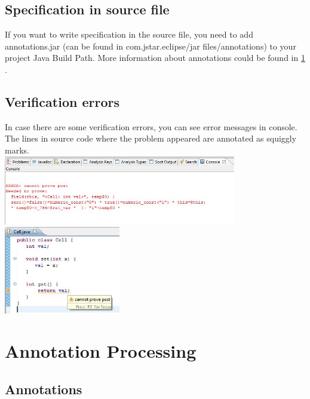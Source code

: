 \documentclass{article}
\begin{document}
\subsection*{Specification in source file}

If you want to write specification in the source file, you need to add annotations.jar (can be found in com.jstar.eclipse/jar files/annotations) to your project Java Build Path. More information about annotations could be found in \ref{sec:annotationprocessing} .

\subsection* {Verification errors}

In case there are some verification errors, you can see error messages in console. The lines in source code where the problem appeared are annotated as squiggly marks.\\

\includegraphics[width=4in]{images/console.jpg}\\

\includegraphics[width=2in]{images/marker.jpg}

\section{Annotation Processing}
\label{sec:annotationprocessing}

\subsection*{Annotations}
\end{document}
